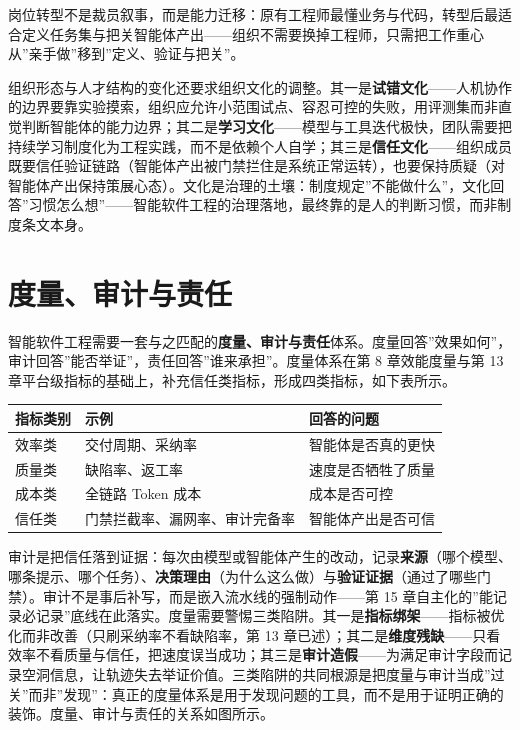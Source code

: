 \documentclass[
]{ctexbook}
\newcounter{none}
\begin{document}
岗位转型不是裁员叙事，而是能力迁移：原有工程师最懂业务与代码，转型后最适合定义任务集与把关智能体产出------组织不需要换掉工程师，只需把工作重心从''亲手做''移到''定义、验证与把关''。

组织形态与人才结构的变化还要求组织文化的调整。其一是\textbf{试错文化}------人机协作的边界要靠实验摸索，组织应允许小范围试点、容忍可控的失败，用评测集而非直觉判断智能体的能力边界；其二是\textbf{学习文化}------模型与工具迭代极快，团队需要把持续学习制度化为工程实践，而不是依赖个人自学；其三是\textbf{信任文化}------组织成员既要信任验证链路（智能体产出被门禁拦住是系统正常运转），也要保持质疑（对智能体产出保持策展心态）。文化是治理的土壤：制度规定''不能做什么''，文化回答''习惯怎么想''------智能软件工程的治理落地，最终靠的是人的判断习惯，而非制度条文本身。

\section{度量、审计与责任}\label{ux5ea6ux91cfux5ba1ux8ba1ux4e0eux8d23ux4efb}

智能软件工程需要一套与之匹配的\textbf{度量、审计与责任}体系。度量回答''效果如何''，审计回答''能否举证''，责任回答''谁来承担''。度量体系在第
8 章效能度量与第 13
章平台级指标的基础上，补充信任类指标，形成四类指标，如下表所示。

{\def\LTcaptype{none} %
\begin{longtable}[]{@{}lll@{}}
\toprule\noalign{}
指标类别 & 示例 & 回答的问题 \\
\midrule\noalign{}
\endhead
\bottomrule\noalign{}
\endlastfoot
效率类 & 交付周期、采纳率 & 智能体是否真的更快 \\
质量类 & 缺陷率、返工率 & 速度是否牺牲了质量 \\
成本类 & 全链路 Token 成本 & 成本是否可控 \\
信任类 & 门禁拦截率、漏网率、审计完备率 & 智能体产出是否可信 \\
\end{longtable}
}

审计是把信任落到证据：每次由模型或智能体产生的改动，记录\textbf{来源}（哪个模型、哪条提示、哪个任务）、\textbf{决策理由}（为什么这么做）与\textbf{验证证据}（通过了哪些门禁）。审计不是事后补写，而是嵌入流水线的强制动作------第
15
章自主化的''能记录必记录''底线在此落实。度量需要警惕三类陷阱。其一是\textbf{指标绑架}------指标被优化而非改善（只刷采纳率不看缺陷率，第
13
章已述）；其二是\textbf{维度残缺}------只看效率不看质量与信任，把速度误当成功；其三是\textbf{审计造假}------为满足审计字段而记录空洞信息，让轨迹失去举证价值。三类陷阱的共同根源是把度量与审计当成''过关''而非''发现''：真正的度量体系是用于发现问题的工具，而不是用于证明正确的装饰。度量、审计与责任的关系如图所示。
\end{document}
